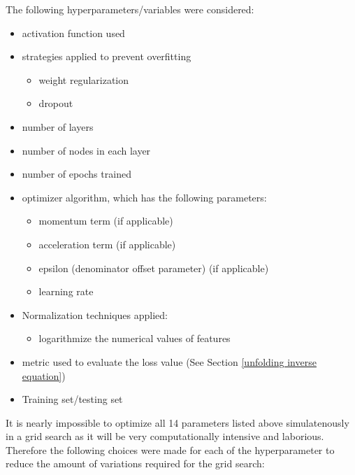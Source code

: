\documentclass[a4paper, 12pt]{article}
\begin{document}
The following hyperparameters/variables were considered:
\begin{itemize}
    \item activation function used
    \item strategies applied to prevent overfitting
    \begin{itemize}
        \item weight regularization
        \item dropout
    \end{itemize}
    \item number of layers
    \item number of nodes in each layer
    \item number of epochs trained
    \item optimizer algorithm, which has the following parameters:
    \begin{itemize}
        \item momentum term (if applicable)
        \item acceleration term (if applicable)
        \item epsilon (denominator offset parameter) (if applicable)
        \item learning rate
    \end{itemize}
    \item Normalization techniques applied:
    \begin{itemize}
        \item logarithmize the numerical values of features
    \end{itemize}
    \item metric used to evaluate the loss value (See Section \ref{unfolding inverse equation})
    \item Training set/testing set
\end{itemize}
It is nearly impossible to optimize all 14 parameters listed above simulatenously in a grid search as it will be very computationally intensive and laborious. Therefore the following choices were made for each of the hyperparameter to reduce the amount of variations required for the grid search:
\end{document}
